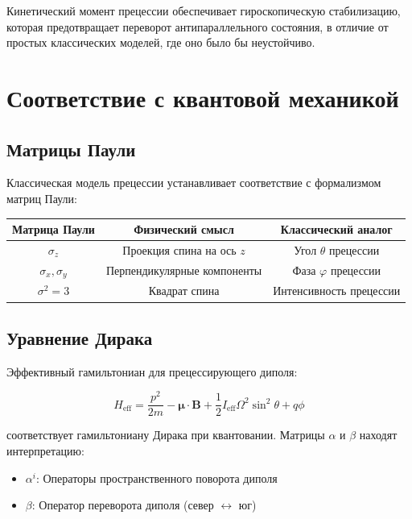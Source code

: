\documentclass[12pt]{article}
\begin{document}
Кинетический момент прецессии обеспечивает гироскопическую стабилизацию, которая предотвращает переворот антипараллельного состояния, в отличие от простых классических моделей, где оно было бы неустойчиво.

\section{Соответствие с квантовой механикой}

\subsection{Матрицы Паули}

Классическая модель прецессии устанавливает соответствие с формализмом матриц Паули:

\begin{center}
\begin{tabular}{|c|c|c|}
\hline
\textbf{Матрица Паули} & \textbf{Физический смысл} & \textbf{Классический аналог} \\
\hline
$\sigma_z$ & Проекция спина на ось $z$ & Угол $\theta$ прецессии \\
$\sigma_x, \sigma_y$ & Перпендикулярные компоненты & Фаза $\varphi$ прецессии \\
$\sigma^2 = 3$ & Квадрат спина & Интенсивность прецессии \\
\hline
\end{tabular}
\end{center}

\subsection{Уравнение Дирака}

Эффективный гамильтониан для прецессирующего диполя:

\begin{equation}
H_{\text{eff}} = \frac{p^2}{2m} - \boldsymbol{\mu} \cdot \boldsymbol{B} + \frac{1}{2} I_{\text{eff}} \Omega^2 \sin^2\theta + q\phi
\end{equation}

соответствует гамильтониану Дирака при квантовании. Матрицы $\alpha$ и $\beta$ находят интерпретацию:

\begin{itemize}
\item $\alpha^i$: Операторы пространственного поворота диполя
\item $\beta$: Оператор переворота диполя (север $\leftrightarrow$ юг)
\end{itemize}
\end{document}
